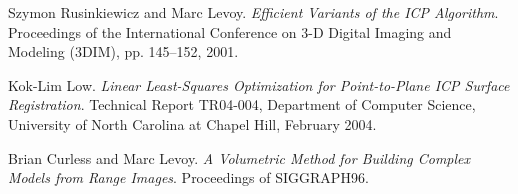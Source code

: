 \documentclass[10pt,twocolumn,letterpaper]{article}
\begin{document}
\begin{thebibliography}{99}
Szymon Rusinkiewicz and Marc Levoy.
\emph{Efficient Variants of the ICP Algorithm}.
Proceedings of the International Conference on 3-D Digital Imaging and
Modeling (3DIM), pp. 145–152, 2001.

Kok-Lim Low.
\emph{Linear Least-Squares Optimization for
Point-to-Plane ICP Surface Registration}.
Technical Report TR04-004, Department of Computer Science, University of North Carolina at Chapel Hill, February 2004.

Brian Curless and Marc Levoy.
\emph{A Volumetric Method for Building Complex Models from Range Images}.
Proceedings of SIGGRAPH96.

\end{thebibliography}
\end{document}
